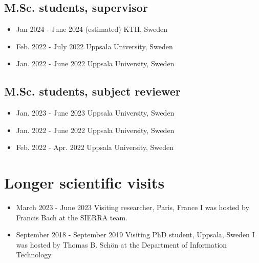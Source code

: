 \documentclass[10pt,A4]{article} %
\begin{document}
  \subsection{\noindent M.Sc.  students, supervisor  }
  \begin{itemize}
    
        \item {}
        { Jan 2024 - June 2024 (estimated) }
        { KTH, Sweden }
        {  }
     
        \item {}
        { Feb. 2022 - July 2022 }
        { Uppsala University, Sweden }
        {  }
     
        \item {}
        { Jan. 2022 - June 2022 }
        { Uppsala University, Sweden }
        {  }
     
  \end{itemize}

  \subsection{\noindent M.Sc.  students, subject reviewer  }
  \begin{itemize}
    
        \item {}
        { Jan. 2023 - June 2023 }
        { Uppsala University, Sweden }
        {  }
     
        \item {}
        { Jan. 2022 - June 2022 }
        { Uppsala University, Sweden }
        {  }
     
        \item {}
        { Feb. 2022 - Apr. 2022 }
        { Uppsala University, Sweden }
        {  }
     
  \end{itemize}


\section{Longer scientific visits}

    \begin{itemize}
    
        \item {}
        { March 2023 - June 2023 }
        { Visiting researcher, Paris, France }
        { I was hosted by Francis Bach at the SIERRA team.}
        
        \item {}
        { September 2018 - September 2019 }
        { Visiting PhD student, Uppsala, Sweden }
        { I was hosted by Thomas B. Schön at the Department of Information Technology.}
        
    \end{itemize}
\end{document}
